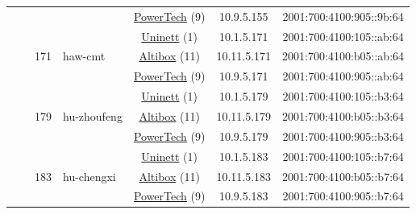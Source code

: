 \begin{small}
\begin{center}
\begin{longtable}{|c|c|c|c|c|c|c|c|}
  &  &  &  & \multicolumn{2}{|c|}{\tiny{\href{http://www.powertech.no}{PowerTech} (9)}} & \tiny{10.9.5.155} & \tiny{2001:700:4100:905::9b:64} \\* \cline{3-3}\cline{4-4}\cline{5-5}\cline{6-6}\cline{7-7}\cline{8-8}
  &  & \multirow{3}{*}{\tiny{171}} & \multicolumn{1}{|l|}{\multirow{3}{*}{\tiny{haw-cmt}}} & \multicolumn{2}{|c|}{\tiny{\href{https://www.uninett.no}{Uninett} (1)}} & \tiny{10.1.5.171} & \tiny{2001:700:4100:105::ab:64} \\* \cline{5-5}\cline{6-6}\cline{7-7}\cline{8-8}
  &  &  &  & \multicolumn{2}{|c|}{\tiny{\href{https://www.altibox.no}{Altibox} (11)}} & \tiny{10.11.5.171} & \tiny{2001:700:4100:b05::ab:64} \\* \cline{5-5}\cline{6-6}\cline{7-7}\cline{8-8}
  &  &  &  & \multicolumn{2}{|c|}{\tiny{\href{http://www.powertech.no}{PowerTech} (9)}} & \tiny{10.9.5.171} & \tiny{2001:700:4100:905::ab:64} \\* \cline{3-3}\cline{4-4}\cline{5-5}\cline{6-6}\cline{7-7}\cline{8-8}
  &  & \multirow{3}{*}{\tiny{179}} & \multicolumn{1}{|l|}{\multirow{3}{*}{\tiny{hu-zhoufeng}}} & \multicolumn{2}{|c|}{\tiny{\href{https://www.uninett.no}{Uninett} (1)}} & \tiny{10.1.5.179} & \tiny{2001:700:4100:105::b3:64} \\* \cline{5-5}\cline{6-6}\cline{7-7}\cline{8-8}
  &  &  &  & \multicolumn{2}{|c|}{\tiny{\href{https://www.altibox.no}{Altibox} (11)}} & \tiny{10.11.5.179} & \tiny{2001:700:4100:b05::b3:64} \\* \cline{5-5}\cline{6-6}\cline{7-7}\cline{8-8}
  &  &  &  & \multicolumn{2}{|c|}{\tiny{\href{http://www.powertech.no}{PowerTech} (9)}} & \tiny{10.9.5.179} & \tiny{2001:700:4100:905::b3:64} \\* \cline{3-3}\cline{4-4}\cline{5-5}\cline{6-6}\cline{7-7}\cline{8-8}
  &  & \multirow{3}{*}{\tiny{183}} & \multicolumn{1}{|l|}{\multirow{3}{*}{\tiny{hu-chengxi}}} & \multicolumn{2}{|c|}{\tiny{\href{https://www.uninett.no}{Uninett} (1)}} & \tiny{10.1.5.183} & \tiny{2001:700:4100:105::b7:64} \\* \cline{5-5}\cline{6-6}\cline{7-7}\cline{8-8}
  &  &  &  & \multicolumn{2}{|c|}{\tiny{\href{https://www.altibox.no}{Altibox} (11)}} & \tiny{10.11.5.183} & \tiny{2001:700:4100:b05::b7:64} \\* \cline{5-5}\cline{6-6}\cline{7-7}\cline{8-8}
  &  &  &  & \multicolumn{2}{|c|}{\tiny{\href{http://www.powertech.no}{PowerTech} (9)}} & \tiny{10.9.5.183} & \tiny{2001:700:4100:905::b7:64} \\* \cline{3-3}\cline{4-4}\cline{5-5}\cline{6-6}\cline{7-7}\cline{8-8}

\end{longtable}
\end{center}
\end{small}
